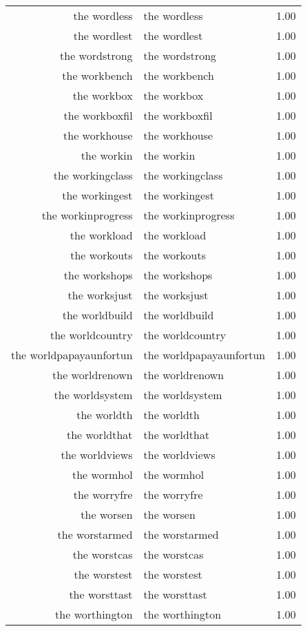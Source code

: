 \begin{table}[ht]
\begin{tabular}{rlr}
  the wordless & the wordless & 1.00 \\ 
  the wordlest & the wordlest & 1.00 \\ 
  the wordstrong & the wordstrong & 1.00 \\ 
  the workbench & the workbench & 1.00 \\ 
  the workbox & the workbox & 1.00 \\ 
  the workboxfil & the workboxfil & 1.00 \\ 
  the workhouse & the workhouse & 1.00 \\ 
  the workin & the workin & 1.00 \\ 
  the workingclass & the workingclass & 1.00 \\ 
  the workingest & the workingest & 1.00 \\ 
  the workinprogress & the workinprogress & 1.00 \\ 
  the workload & the workload & 1.00 \\ 
  the workouts & the workouts & 1.00 \\ 
  the workshops & the workshops & 1.00 \\ 
  the worksjust & the worksjust & 1.00 \\ 
  the worldbuild & the worldbuild & 1.00 \\ 
  the worldcountry & the worldcountry & 1.00 \\ 
  the worldpapayaunfortun & the worldpapayaunfortun & 1.00 \\ 
  the worldrenown & the worldrenown & 1.00 \\ 
  the worldsystem & the worldsystem & 1.00 \\ 
  the worldth & the worldth & 1.00 \\ 
  the worldthat & the worldthat & 1.00 \\ 
  the worldviews & the worldviews & 1.00 \\ 
  the wormhol & the wormhol & 1.00 \\ 
  the worryfre & the worryfre & 1.00 \\ 
  the worsen & the worsen & 1.00 \\ 
  the worstarmed & the worstarmed & 1.00 \\ 
  the worstcas & the worstcas & 1.00 \\ 
  the worstest & the worstest & 1.00 \\ 
  the worsttast & the worsttast & 1.00 \\ 
  the worthington & the worthington & 1.00 \\ 

\end{tabular}
\end{table}
